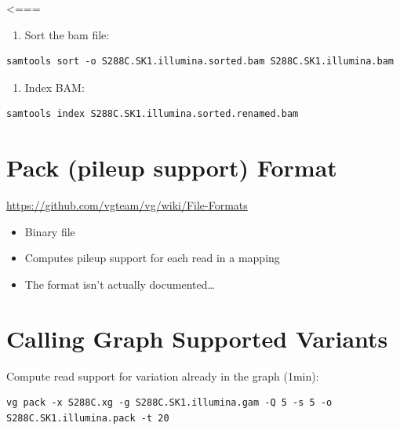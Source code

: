 \documentclass[
]{book}
\providecommand{\tightlist}{%
  \setlength{\itemsep}{0pt}\setlength{\parskip}{0pt}}
\begin{document}
\textless===

\begin{enumerate}
\def\labelenumi{\arabic{enumi}.}
\setcounter{enumi}{3}
\tightlist
\item
  Sort the bam file:
\end{enumerate}

\begin{verbatim}
samtools sort -o S288C.SK1.illumina.sorted.bam S288C.SK1.illumina.bam
\end{verbatim}

\begin{enumerate}
\def\labelenumi{\arabic{enumi}.}
\setcounter{enumi}{4}
\tightlist
\item
  Index BAM:
\end{enumerate}

\begin{verbatim}
samtools index S288C.SK1.illumina.sorted.renamed.bam
\end{verbatim}

\hypertarget{pack-pileup-support-format}{%
\section{Pack (pileup support) Format}\label{pack-pileup-support-format}}

\url{https://github.com/vgteam/vg/wiki/File-Formats}

\begin{itemize}
\tightlist
\item
  Binary file
\item
  Computes pileup support for each read in a mapping
\item
  The format isn't actually documented\ldots{}
\end{itemize}

\hypertarget{calling-graph-supported-variants}{%
\section{Calling Graph Supported Variants}\label{calling-graph-supported-variants}}

Compute read support for variation already in the graph (1min):

\begin{verbatim}
vg pack -x S288C.xg -g S288C.SK1.illumina.gam -Q 5 -s 5 -o S288C.SK1.illumina.pack -t 20
\end{verbatim}
\end{document}
